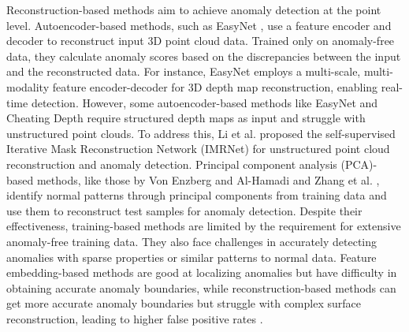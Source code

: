 Reconstruction-based methods aim to achieve anomaly detection at the point level. Autoencoder-based methods, such as EasyNet \cite{chen_easynet_2023}, use a feature encoder and decoder to reconstruct input 3D point cloud data. Trained only on anomaly-free data, they calculate anomaly scores based on the discrepancies between the input and the reconstructed data. For instance, EasyNet employs a multi-scale, multi-modality feature encoder-decoder for 3D depth map reconstruction, enabling real-time detection. However, some autoencoder-based methods like EasyNet and Cheating Depth \cite{zavrtanik_cheating_2024} require structured depth maps as input and struggle with unstructured point clouds. To address this, Li et al. \cite{li_towards_2023} proposed the self-supervised Iterative Mask Reconstruction Network (IMRNet) for unstructured point cloud reconstruction and anomaly detection. Principal component analysis (PCA)-based methods, like those by Von Enzberg and Al-Hamadi \cite{von_enzberg_multiresolution_2016} and Zhang et al. \cite{zhang_automatic_2018}, identify normal patterns through principal components from training data and use them to reconstruct test samples for anomaly detection.
Despite their effectiveness, training-based methods are limited by the requirement for extensive anomaly-free training data. They also face challenges in accurately detecting anomalies with sparse properties or similar patterns to normal data. Feature embedding-based methods are good at localizing anomalies but have difficulty in obtaining accurate anomaly boundaries, while reconstruction-based methods can get more accurate anomaly boundaries but struggle with complex surface reconstruction, leading to higher false positive rates \cite{masuda_toward_2023,zavrtanik_cheating_2024,li_towards_2023,roth_towards_2022}.


